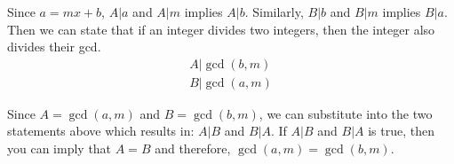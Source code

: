 \documentclass[letterpaper, 12pt]{article}
\begin{document}
Since $a = mx + b$, $A|a$ and $A|m$ implies $A|b$. Similarly, $B|b$ and $B|m$ implies $B|a$. Then we can state that if an integer divides two integers, then the integer also divides their gcd.
\begin{align*}
    A|\gcd(b,m)\\
    B|\gcd(a,m)
\end{align*}

Since $A = \gcd(a, m)$ and $B = \gcd(b,m)$, we can substitute into the two statements above which results in: $A|B$ and $B|A$. If $A|B$ and $B|A$ is true, then you can imply that $A = B$ and therefore, $\gcd(a,m) = \gcd(b,m)$.
\end{document}

